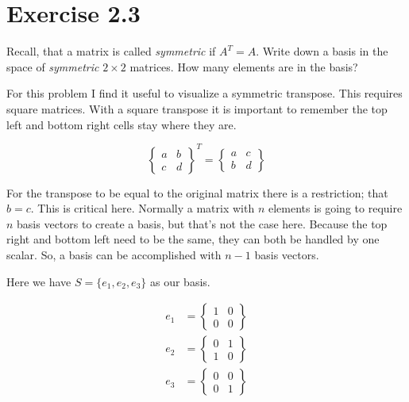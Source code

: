\section*{Exercise 2.3}

Recall, that a matrix is called \emph{symmetric} if $A^T = A$. Write down a basis in the space of \emph{symmetric} $2 \times 2$ matrices. How many elements are in the basis?

For this problem I find it useful to visualize a symmetric transpose. This requires square matrices. With a square transpose it is important to remember the top left and bottom right cells stay where they are.  

\[
	\begin{Bmatrix}
		a & b \\
		c & d
	\end{Bmatrix}^T
= 
\begin{Bmatrix}
	a & c \\
	b & d
\end{Bmatrix}
\]

For the transpose to be equal to the original matrix there is a restriction; that $b = c$. This is critical here. Normally a matrix with $n$ elements is going to require $n$ basis vectors to create a basis, but that's not the case here. Because the top right and bottom left need to be the same, they can both be handled by one scalar. So, a basis can be accomplished with $n - 1$ basis vectors.

Here we have $S = \{e_{1}, e_{2}, e_{3}\}$ as our basis.

\[
\begin{aligned}
e_{1} &= 
\begin{Bmatrix}
	1 & 0 \\
	0 & 0
\end{Bmatrix}
\\ 
e_{2} &= 
\begin{Bmatrix}
	0 & 1 \\
	1 & 0
\end{Bmatrix}
\\
e_{3} &= 
\begin{Bmatrix}
	0 & 0 \\
	0 & 1
\end{Bmatrix}
\end{aligned}
\]


